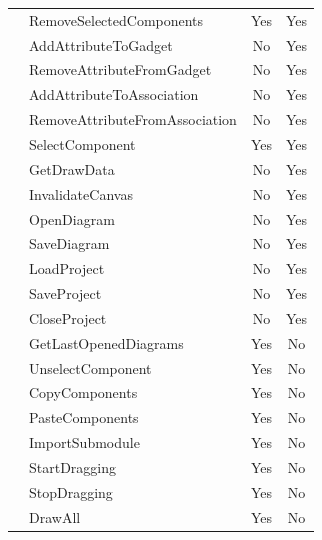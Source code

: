 \documentclass[12pt]{article}
\begin{document}
\begin{longtable}{|l|l|c|c|}
        & RemoveSelectedComponents       & Yes             & Yes           \\
        & AddAttributeToGadget           & No              & Yes           \\
        & RemoveAttributeFromGadget      & No              & Yes           \\
        & AddAttributeToAssociation      & No              & Yes           \\
        & RemoveAttributeFromAssociation & No              & Yes           \\
        & SelectComponent                & Yes             & Yes           \\
        & GetDrawData                    & No              & Yes           \\
        & InvalidateCanvas               & No              & Yes           \\
        & OpenDiagram                    & No              & Yes           \\
        & SaveDiagram                    & No              & Yes           \\
        & LoadProject                    & No              & Yes           \\
        & SaveProject                    & No              & Yes           \\
        & CloseProject                   & No              & Yes           \\
        & GetLastOpenedDiagrams          & Yes             & No            \\
        & UnselectComponent              & Yes             & No            \\
        & CopyComponents                 & Yes             & No            \\
        & PasteComponents                & Yes             & No            \\
        & ImportSubmodule                & Yes             & No            \\
        & StartDragging                  & Yes             & No            \\
        & StopDragging                   & Yes             & No            \\
        & DrawAll                        & Yes             & No            \\
        \hline

    \end{longtable}
\end{document}
